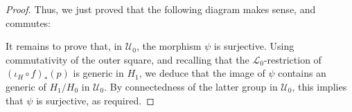 \documentclass[10pt,a4paper]{amsart}
\newcommand{\Ualg}{\mathcal{U}_0}
\begin{document}
\begin{proof}
Thus, we just proved that the following diagram makes sense, and commutes:

\begin{center}
\end{center}


It remains to prove that, in $\Ualg$, the morphism $\psi$ is surjective. Using commutativity of the outer square, and recalling that the $\mathcal{L}_0$-restriction of ${(\iota_H \circ f)}_*(p)$ is generic in $H_1$, we deduce that the image of $\psi$ contains an generic of $H_1 / H_0$ in $\Ualg$. By connectedness of the latter group in $\Ualg$, this implies that $\psi$ is surjective, as required.
\end{proof}
\end{document}
